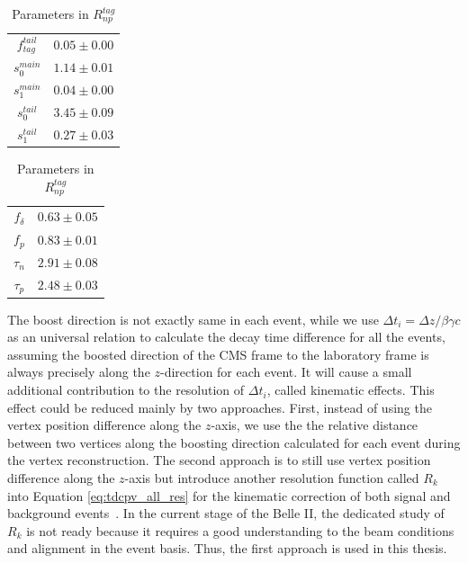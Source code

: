 \begin{table}[H]
	\begin{minipage}[b]{0.5\linewidth}
		\centering
		\caption{Parameters in $R^{tag}_{det}$}
		\label{tab:Rtagdet}
		\begin{tabular}{|c|c|}
			\hline
			$f_{tag}^{tail}$ & $0.05 \pm 0.00$\\
			$s_0^{main}$&  $1.14 \pm 0.01$ \\
			$s_1^{main}$ & $0.04\pm 0.00$\\
			$s_0^{tail}$ &  $3.45\pm 0.09$\\
			$s_1^{tail}$  & $0.27\pm0.03$ \\
			\hline
		\end{tabular}
	\end{minipage}
	\begin{minipage}[b]{0.5\linewidth}
		\centering
		\caption{Parameters in $R^{tag}_{np}$}
		\label{tab:Rtagnp}
		\begin{tabular}{|c|c|}
			\hline
			$f_{\delta}$ & $0.63\pm 0.05$\\
			$f_p$ &  $0.83 \pm 0.01$ \\
			$\tau_n$ & $2.91\pm 0.08$\\
			$\tau_p$ &  $2.48\pm 0.03$\\
			\hline
		\end{tabular}
	\end{minipage}
\end{table}

The boost direction is not exactly same in each event, while we use $\Delta t_i = \Delta z / \beta\gamma c$ as an universal relation to calculate the decay time difference for all the events, assuming the boosted direction of the CMS frame to the laboratory frame is always precisely along the $z$-direction for each event. It will cause a small additional contribution to the resolution of $\Delta t_i$, called kinematic effects. This effect could be reduced mainly by two approaches. First, instead of using the vertex position difference along the $z$-axis, we use the the relative distance between two vertices along the boosting direction calculated for each event during the vertex reconstruction. The second approach is to still use vertex position difference along the $z$-axis but introduce another resolution function called $R_k$ into Equation \ref{eq:tdcpv_all_res} for the kinematic correction of both signal and background events~\cite{tajima2004proper}. 
In the current stage of the Belle II, the dedicated study of $R_k$ is not ready because it requires a good understanding to the beam conditions and alignment in the event basis. Thus, the first approach is used in this thesis. 



